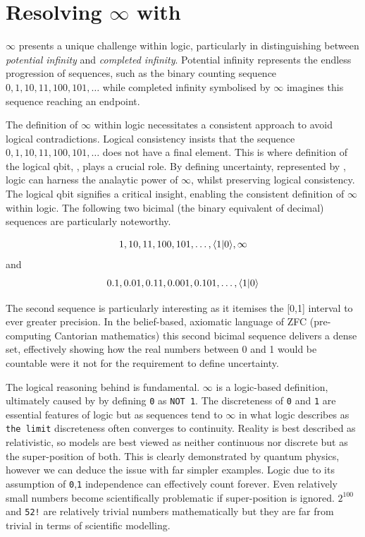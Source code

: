 \documentclass[12pt]{article}
\begin{document}
\section*{Resolving $\infty$ with \qbit{}}

$\infty$ presents a unique challenge within logic, particularly in distinguishing between \textit{potential infinity} and \textit{completed infinity}. Potential infinity represents the endless progression of sequences, such as the binary counting sequence $0, 1, 10, 11, 100, 101, \ldots$ while completed infinity symbolised by $\infty$ imagines this sequence reaching an endpoint.

The definition of $\infty$ within logic necessitates a consistent approach to avoid logical contradictions. Logical consistency insists that the sequence $0, 1, 10, 11, 100, 101, \ldots$ does not have a final element. This is where definition of the logical qbit, \qbit{}, plays a crucial role. By defining uncertainty, represented by \qbit{}, logic can harness the analaytic power of $\infty$, whilst preserving logical consistency. The logical qbit signifies a critical insight, enabling the consistent definition of $\infty$ within logic. The following two bicimal (the binary equivalent of decimal) sequences are particularly noteworthy.

\begin{equation}
    1, 10, 11, 100, 101, \ldots, \langle 1 | 0 \rangle{}, \infty
\end{equation}
and
\begin{equation}
    0.1, 0.01, 0.11, 0.001, 0.101, \ldots, \langle 1 | 0 \rangle{}
\end{equation}

The second sequence is particularly interesting as it itemises the [0,1] interval to ever greater precision. In the belief-based, axiomatic language of ZFC (pre-computing Cantorian mathematics) this second bicimal sequence delivers a dense set, effectively showing how the real numbers between 0 and 1 would be countable were it not for the requirement to define \qbit{} uncertainty.

The logical reasoning behind \qbit{} is fundamental. $\infty$ is a logic-based definition, ultimately caused by by defining \texttt{0} as \texttt{NOT 1}. The discreteness of \texttt{0} and \texttt{1} are essential features of logic but as sequences tend to $\infty$ in what logic describes as \texttt{the limit} discreteness often converges to continuity. Reality is best described as relativistic, so models are best viewed as neither continuous nor discrete but as the super-position of both. This is clearly demonstrated by quantum physics, however we can deduce the issue with far simpler examples. Logic due to its assumption of \texttt{0},\texttt{1} independence can effectively count forever. Even relatively small numbers become scientifically problematic if \qbit{} super-position is ignored. $2^{100}$ and \texttt{52!} are relatively trivial numbers mathematically but they are far from trivial in terms of scientific modelling.
\end{document}
